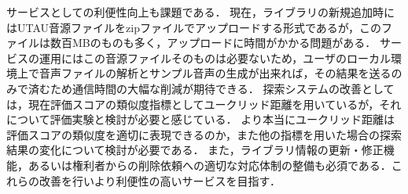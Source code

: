 サービスとしての利便性向上も課題である．
現在，ライブラリの新規追加時にはUTAU音源ファイルをzipファイルでアップロードする形式であるが，このファイルは数百MBのものも多く，アップロードに時間がかかる問題がある．
サービスの運用にはこの音源ファイルそのものは必要ないため，ユーザのローカル環境上で音声ファイルの解析とサンプル音声の生成が出来れば，その結果を送るのみで済むため通信時間の大幅な削減が期待できる．
探索システムの改善としては，現在評価スコアの類似度指標としてユークリッド距離を用いているが，それについて評価実験と検討が必要と感じている．
より本当にユークリッド距離は評価スコアの類似度を適切に表現できるのか，また他の指標を用いた場合の探索結果の変化について検討が必要である．
また，ライブラリ情報の更新・修正機能，あるいは権利者からの削除依頼への適切な対応体制の整備も必須である．これらの改善を行いより利便性の高いサービスを目指す．

